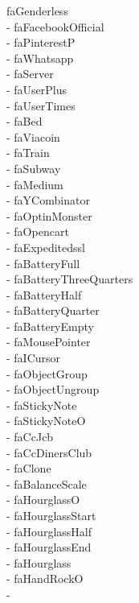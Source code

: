 \documentclass[%
               doublesided,
               paper=a4,
               fontsize=10pt
              ]{my-resume}
\begin{document}
faGenderless\\ \faFacebookOfficial - faFacebookOfficial\\ \faPinterestP - faPinterestP\\ \faWhatsapp - faWhatsapp\\ \faServer - faServer\\ \faUserPlus - faUserPlus\\ \faUserTimes - faUserTimes\\ \faBed - faBed\\ \faViacoin - faViacoin\\ \faTrain - faTrain\\ \faSubway - faSubway\\ \faMedium - faMedium\\ \faYCombinator - faYCombinator\\ \faOptinMonster - faOptinMonster\\ \faOpencart - faOpencart\\ \faExpeditedssl - faExpeditedssl\\ \faBatteryFull - faBatteryFull\\ \faBatteryThreeQuarters - faBatteryThreeQuarters\\ \faBatteryHalf - faBatteryHalf\\ \faBatteryQuarter - faBatteryQuarter\\ \faBatteryEmpty - faBatteryEmpty\\ \faMousePointer - faMousePointer\\ \faICursor - faICursor\\ \faObjectGroup - faObjectGroup\\ \faObjectUngroup - faObjectUngroup\\ \faStickyNote - faStickyNote\\ \faStickyNoteO - faStickyNoteO\\ \faCcJcb - faCcJcb\\ \faCcDinersClub - faCcDinersClub\\ \faClone - faClone\\ \faBalanceScale - faBalanceScale\\ \faHourglassO - faHourglassO\\ \faHourglassStart - faHourglassStart\\ \faHourglassHalf - faHourglassHalf\\ \faHourglassEnd - faHourglassEnd\\ \faHourglass - faHourglass\\ \faHandRockO - faHandRockO\\ \faHandPaperO - 
\end{document}
